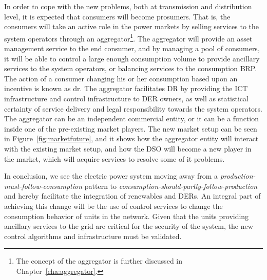 In order to cope with the new problems, both at transmission and distribution level, it is expected that consumers will become prosumers. That is, the consumers will take an active role in the power markets by selling services to the system operators through an aggregator\footnote{The concept of the aggregator is further discussed in Chapter~\ref{cha:aggregator}.}. The aggregator will provide an asset management service to the end consumer, and by managing a pool of consumers, it will be able to control a large enough consumption volume to provide ancillary services to the system operators, or balancing services to the consumption BRP. The action of a consumer changing his or her consumption based upon an incentive is known as \gls{dr}. The aggregator facilitates DR by providing the ICT infrastructure and control infrastructure to DER owners, as well as statistical certainty of service delivery and legal responsibility towards the system operators. The aggregator can be an independent commercial entity, or it can be a function inside one of the pre-existing market players. The new market setup can be seen in Figure~\ref{fig:marketfuture}, and it shows how the aggregator entity will interact with the existing market setup, and how the DSO will become a new player in the market, which will acquire services to resolve some of it problems.

In conclusion, we see the electric power system moving away from a \emph{production-must-follow-consumption} pattern to \emph{consumption-should-partly-follow-production} and hereby facilitate the integration of renewables and DERs. An integral part of achieving this change will be the use of control services to change the consumption behavior of units in the network. Given that the units providing ancillary services to the grid are critical for the security of the system, the new control algorithms and infrastructure must be validated.


